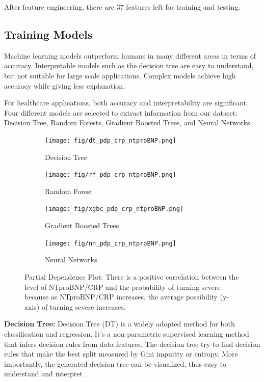 \par
After feature engineering, there are 37 features left for training and testing.

\subsection{\textbf{Training Models}}

Machine learning models outperform humans in many different areas in terms of accuracy. Interpretable models such as the decision tree are easy to understand, but not suitable for large scale applications. Complex models achieve high accuracy while giving less explanation. 

For healthcare applications, both accuracy and interpretability are significant. Four different models are selected to extract information from our dataset: Decision Tree, Random Forests, Gradient Boosted Trees, and Neural Networks.

\begin{figure}
\centering
\begin{subfigure}[b]{0.475\textwidth}
    \centering
    \texttt{[image: fig/dt\_pdp\_crp\_ntproBNP.png]}
    \caption{Decision Tree}
    \label{fig:dt_pdp}
\end{subfigure}
\begin{subfigure}[b]{0.475\textwidth}
    \centering
    \texttt{[image: fig/rf\_pdp\_crp\_ntproBNP.png]}
    \caption{Random Forest}
    \label{fig:rf_pdp}
\end{subfigure}
\begin{subfigure}[b]{0.475\textwidth}
    \centering
    \texttt{[image: fig/xgbc\_pdp\_crp\_ntproBNP.png]}
    \caption{Gradient Boosted Trees}
    \label{fig:gbt_pdp}
\end{subfigure}
\begin{subfigure}[b]{0.475\textwidth}
    \centering
    \texttt{[image: fig/nn\_pdp\_crp\_ntproBNP.png]}
    \caption{Neural Networks}
    \label{fig:nn_pdp}
\end{subfigure}
\caption{Partial Dependence Plot: There is a positive correlation between the level of NTproBNP/CRP and the probability of turning severe because as NTproBNP/CRP increases, the average possibility (y-axis) of turning severe increases.}
\label{fig.pdp}
\end{figure}

\textbf{Decision Tree:} Decision Tree (DT) is a widely adopted method for both classification and regression. It's a non-parametric supervised learning method that infers decision rules from data features. The decision tree try to find decision rules that make the best split measured by Gini impurity or entropy. More importantly, the generated decision tree can be visualized, thus easy to understand and interpret \cite{Breiman2015Classification}.

